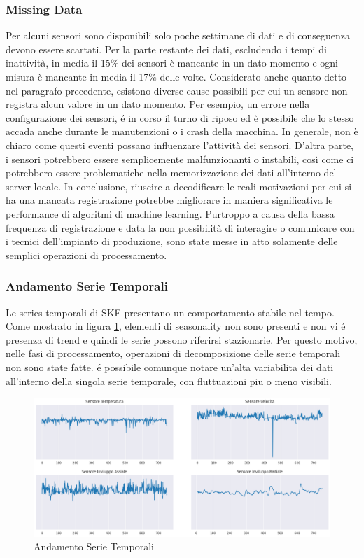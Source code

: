 \subsubsection{Missing Data}
Per alcuni sensori sono disponibili solo poche settimane di dati e di conseguenza devono essere scartati. Per la parte restante dei dati, escludendo i tempi di inattività, in media il 15\% dei sensori è mancante in un dato momento e ogni misura è mancante in media il 17\% delle volte. Considerato anche quanto detto nel paragrafo precedente, esistono diverse cause possibili per cui un sensore non registra alcun valore in un dato momento. Per esempio, un errore nella configurazione dei sensori, é in corso il turno di riposo ed è possibile che lo stesso accada anche durante le manutenzioni o i crash della macchina.
In generale, non è chiaro come questi eventi possano influenzare l'attività dei sensori. D'altra parte, i sensori potrebbero essere semplicemente malfunzionanti o instabili, così come ci potrebbero essere problematiche nella memorizzazione dei dati all'interno del server locale. 
In conclusione, riuscire a decodificare le reali motivazioni per cui si ha una mancata registrazione potrebbe migliorare in maniera significativa le performance di algoritmi di machine learning. Purtroppo a causa della bassa frequenza di registrazione e data la non possibilità di interagire o comunicare con i tecnici dell'impianto di produzione, sono state messe in atto solamente delle semplici operazioni di processamento.

\subsubsection{Andamento Serie Temporali}
Le series temporali di SKF presentano un comportamento stabile nel tempo. Come mostrato in figura \ref{sensors_plot}, elementi di seasonality non sono presenti e non vi é presenza di trend e quindi le serie possono riferirsi stazionarie.
Per questo motivo, nelle fasi di processamento, operazioni di decomposizione delle serie temporali non sono state fatte.
é possibile comunque notare un'alta variabilita dei dati all'interno della singola serie temporale, con fluttuazioni piu o meno visibili.
\begin{figure}[t]
	\centering
	\includegraphics[width=14cm, scale=1]{images/sensors_plot}
	\caption{Andamento Serie Temporali}
	\label{sensors_plot}
		
\end{figure}


